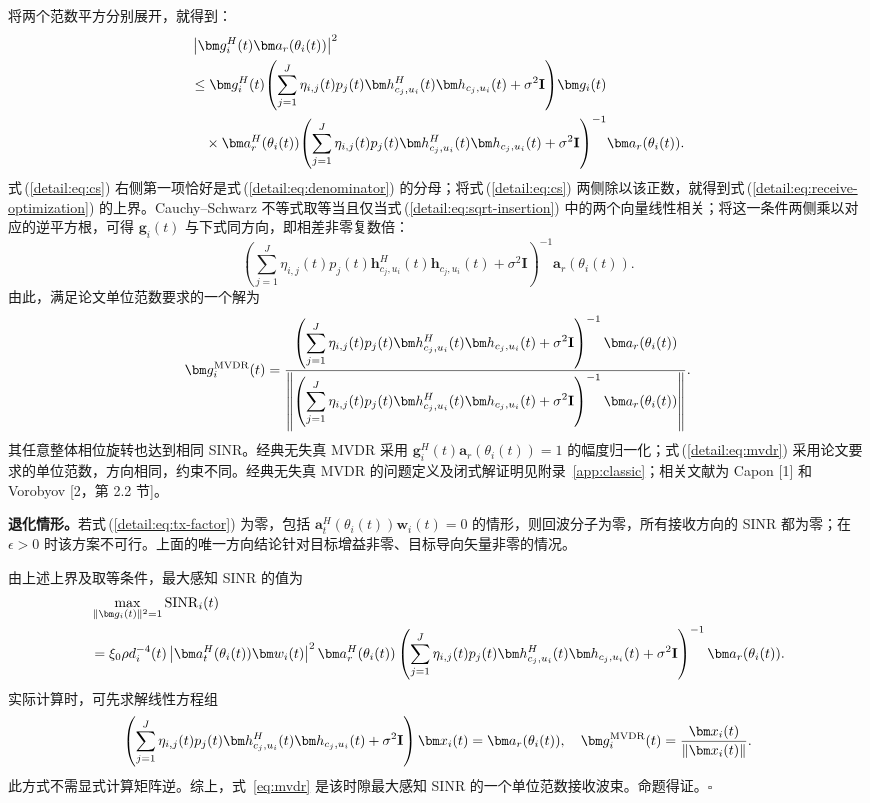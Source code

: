将两个范数平方分别展开，就得到：
\begin{align}
&\left|\bm g_i^H(t)\bm a_r(\theta_i(t))\right|^2\notag\\
&\le\bm g_i^H(t)\!\left(\sum_{j=1}^J\eta_{i,j}(t)p_j(t)
\bm h_{c_j,u_i}^{H}(t)\bm h_{c_j,u_i}(t)+\sigma^2\mathbf I\right)\!\bm g_i(t)\notag\\
&\quad\times\bm a_r^H(\theta_i(t))\!\left(\sum_{j=1}^J\eta_{i,j}(t)p_j(t)
\bm h_{c_j,u_i}^{H}(t)\bm h_{c_j,u_i}(t)+\sigma^2\mathbf I\right)^{-1}\!\bm a_r(\theta_i(t)).\label{detail:eq:cs}
\end{align}
式\,(\ref{detail:eq:cs}) 右侧第一项恰好是式\,(\ref{detail:eq:denominator}) 的分母；将式\,(\ref{detail:eq:cs}) 两侧除以该正数，就得到式\,(\ref{detail:eq:receive-optimization}) 的上界。Cauchy--Schwarz 不等式取等当且仅当式\,(\ref{detail:eq:sqrt-insertion}) 中的两个向量线性相关；将这一条件两侧乘以对应的逆平方根，可得 $\bm g_i(t)$ 与下式同方向，即相差非零复数倍：
\begin{equation}\label{detail:eq:direction}
\left(\sum_{j=1}^J\eta_{i,j}(t)p_j(t)
\bm h_{c_j,u_i}^{H}(t)\bm h_{c_j,u_i}(t)+\sigma^2\mathbf I\right)^{-1}
\bm a_r(\theta_i(t)).
\end{equation}
由此，满足论文单位范数要求的一个解为
\begin{equation}\label{detail:eq:mvdr}
\bm g_i^{\rm MVDR}(t)=
\frac{\left(\displaystyle\sum_{j=1}^J\eta_{i,j}(t)p_j(t)
\bm h_{c_j,u_i}^{H}(t)\bm h_{c_j,u_i}(t)+\sigma^2\mathbf I\right)^{-1}
\bm a_r(\theta_i(t))}
{\left\|\left(\displaystyle\sum_{j=1}^J\eta_{i,j}(t)p_j(t)
\bm h_{c_j,u_i}^{H}(t)\bm h_{c_j,u_i}(t)+\sigma^2\mathbf I\right)^{-1}
\bm a_r(\theta_i(t))\right\|}.
\end{equation}
其任意整体相位旋转也达到相同 SINR。经典无失真 MVDR 采用 $\bm g_i^H(t)\bm a_r(\theta_i(t))=1$ 的幅度归一化；式\,(\ref{detail:eq:mvdr}) 采用论文要求的单位范数，方向相同，约束不同。经典无失真 MVDR 的问题定义及闭式解证明见附录~\ref{app:classic}；相关文献为 Capon [1] 和 Vorobyov [2，第 2.2 节]。

\textbf{退化情形。}若式\,(\ref{detail:eq:tx-factor}) 为零，包括 $\bm a_t^H(\theta_i(t))\bm w_i(t)=0$ 的情形，则回波分子为零，所有接收方向的 SINR 都为零；在 $\epsilon>0$ 时该方案不可行。上面的唯一方向结论针对目标增益非零、目标导向矢量非零的情况。


由上述上界及取等条件，最大感知 SINR 的值为
\begin{align}\label{detail:eq:maximum-value}
&\max_{\|\bm g_i(t)\|^2=1}\operatorname{SINR}_i(t)\notag\\
&=\xi_0\rho d_i^{-4}(t)
\left|\bm a_t^H(\theta_i(t))\bm w_i(t)\right|^2
\bm a_r^H(\theta_i(t))
\left(\sum_{j=1}^J\eta_{i,j}(t)p_j(t)
\bm h_{c_j,u_i}^{H}(t)\bm h_{c_j,u_i}(t)
+\sigma^2\mathbf I\right)^{-1}\bm a_r(\theta_i(t)).
\end{align}
实际计算时，可先求解线性方程组
\begin{equation}\label{detail:eq:solve}
\left(\sum_{j=1}^J\eta_{i,j}(t)p_j(t)
\bm h_{c_j,u_i}^{H}(t)\bm h_{c_j,u_i}(t)
+\sigma^2\mathbf I\right)\bm x_i(t)=\bm a_r(\theta_i(t)),
\quad
\bm g_i^{\rm MVDR}(t)=\frac{\bm x_i(t)}{\|\bm x_i(t)\|}.
\end{equation}
此方式不需显式计算矩阵逆。综上，式~\eqref{eq:mvdr} 是该时隙最大感知 SINR 的一个单位范数接收波束。命题得证。\hfill$\square$

